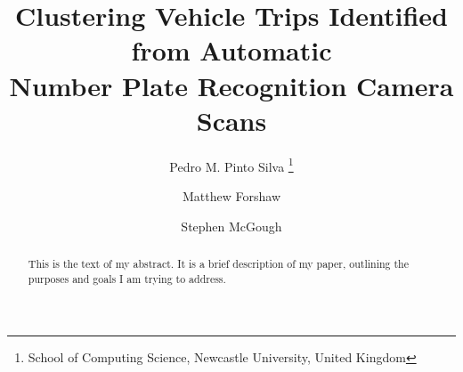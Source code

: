 \documentclass[twoside,leqno,twocolumn]{article}
\begin{document}

\title{\Large Clustering Vehicle Trips Identified from Automatic \\ Number Plate Recognition Camera Scans}
\author{Pedro M. Pinto Silva \thanks{School of Computing Science, Newcastle University, United Kingdom}
\and
Matthew Forshaw\footnotemark[1]
\and
Stephen McGough\footnotemark[1]}
\date{}

\maketitle








\begin{abstract} \small\baselineskip=9pt This is the text of my abstract. It is a brief
description of my
paper, outlining the purposes and goals I am trying to address.\end{abstract}





\end{document}
